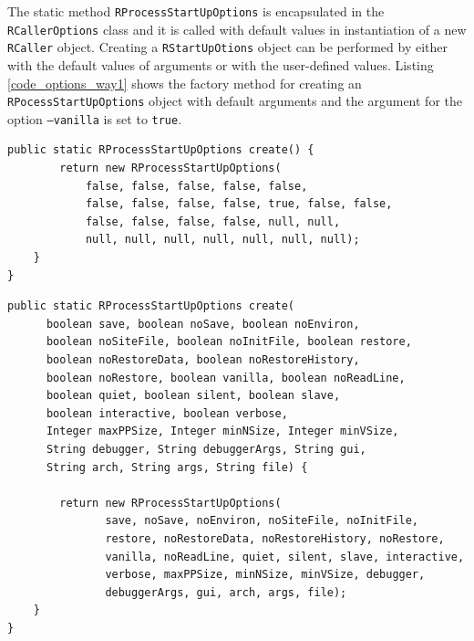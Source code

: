 \documentclass[10pt,a4paper, final, oneside]{article}
\begin{document}
The static method \texttt{RProcessStartUpOptions} is encapsulated in the \texttt{RCallerOptions} class and it is called with default values in instantiation of a new \texttt{RCaller} object. Creating a \texttt{RStartUpOtions} object can be performed by either with the default values of arguments or with the user-defined values. Listing \ref{code_options_way1} shows the factory method for creating an \texttt{RPocessStartUpOptions} object with default arguments and the argument for the option \texttt{--vanilla} is set to \texttt{true}. 

\begin{minipage}{\linewidth}
\begin{lstlisting}[caption=Default RProcessStartUpOptions Creator,label=code_options_way1]
 public static RProcessStartUpOptions create() {
        return new RProcessStartUpOptions(
            false, false, false, false, false,
            false, false, false, false, true, false, false,
            false, false, false, false, null, null,
            null, null, null, null, null, null, null);
    }
}
\end{lstlisting}
\end{minipage}


\begin{minipage}{\linewidth}
\begin{lstlisting}[caption=Custom RProcessStartUpOptions Creator,label=code_options_way2]
public static RProcessStartUpOptions create(
      boolean save, boolean noSave, boolean noEnviron,
      boolean noSiteFile, boolean noInitFile, boolean restore,
      boolean noRestoreData, boolean noRestoreHistory,
      boolean noRestore, boolean vanilla, boolean noReadLine,
      boolean quiet, boolean silent, boolean slave,
      boolean interactive, boolean verbose,
      Integer maxPPSize, Integer minNSize, Integer minVSize,
      String debugger, String debuggerArgs, String gui,
      String arch, String args, String file) {
            
        return new RProcessStartUpOptions(
               save, noSave, noEnviron, noSiteFile, noInitFile, 
               restore, noRestoreData, noRestoreHistory, noRestore, 
               vanilla, noReadLine, quiet, silent, slave, interactive, 
               verbose, maxPPSize, minNSize, minVSize, debugger, 
               debuggerArgs, gui, arch, args, file);
    }
}
\end{lstlisting}
\end{minipage}
\end{document}
